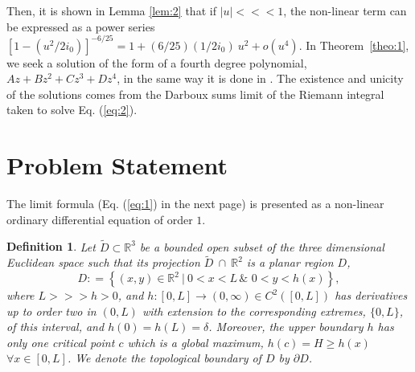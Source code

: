 \documentclass{article}
\newtheorem{definition}{Definition}
\begin{document}
Then, it is shown in Lemma \ref{lem:2} that if $|u|<\!\!<\!\!<1$, 
the non-linear term can be expressed as a power series 
$\left[1-\left(u^2/2i_0\right)\right]^{-6/25}=
    1+(6/25)(1/2i_0)\ u^2
    +o(u^4)$.
In Theorem~\ref{theo:1}, we seek a solution of the form of a fourth degree polynomial,
$Az+Bz^2+Cz^3+Dz^4$, in the same way it is done in \cite{Dorod42,Lees50}.
 The existence and unicity of
the solutions comes from the Darboux sums limit of the Riemann integral 
taken to solve Eq. (\ref{eq:2}).


\section{Problem Statement}
\label{sec:3}

The limit formula  (Eq. (\ref{eq:1}) in the next page) is presented as a non-linear
ordinary differential equation of order $1$.
\begin{definition}\label{defi:1}
Let $\tilde{D}\subset \mathbb{R}^3$ be a bounded open subset 
of the three dimensional Euclidean space such that its projection
$\tilde{D}\ \cap \ \mathbb{R}^2$ 
is a planar region $D$,
\begin{equation*}
D\colon = \left\{(x,y)\in \mathbb{R}^2 \ | \ 
0<x<L \hspace{2pt} \& \hspace{4pt} 0<y<h(x)\right\},
\end{equation*}
where $L>\!\!>\!\!>h>0$, and $h\colon [0,L] \to (0,\infty)\in C^2([0,L])$ 
has derivatives up to order two in $(0,L)$
with extension to the corresponding extremes, $\{0,L\}$, of this interval, 
and $h(0)=h(L)=\delta$. 
Moreover, the upper boundary $h$ has only one critical point $c$ which 
is a global maximum, $h(c)=H\geq h(x)$  $\forall x \in [0,L]$.
We denote the topological boundary of $D$ by $\partial D$.
\end{definition}
\end{document}

